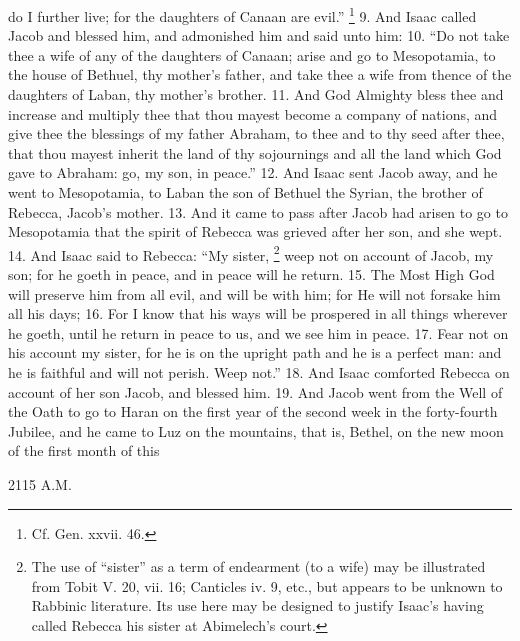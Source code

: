 do I further live; for the daughters of Canaan are evil.'' \footnote{Cf. Gen. xxvii. 46.} 9. And Isaac called Jacob and blessed him, and admonished him and said unto him: 10. ``Do not take thee a wife of any of the daughters of Canaan; arise and go to Mesopotamia, to the house of Bethuel, thy mother's father, and take thee a wife from thence of the daughters of Laban, thy mother's brother. 11. And God Almighty bless thee and increase and multiply thee that thou mayest become a company of nations, and give thee the blessings of my father Abraham, to thee and to thy seed after thee, that thou mayest inherit the land of thy sojournings and all the land which God gave to Abraham: go, my son, in peace.'' 12. And Isaac sent Jacob away, and he went to Mesopotamia, to Laban the son of Bethuel the Syrian, the brother of Rebecca, Jacob's mother. 13. And it came to pass after Jacob had arisen to go to Mesopotamia that the spirit of Rebecca was grieved after her son, and she wept. 14. And Isaac said to Rebecca: ``My sister, \footnote{The use of ``sister'' as a term of endearment (to a wife) may be illustrated from Tobit V. 20, vii. 16; Canticles iv. 9, etc., but appears to be unknown to Rabbinic literature. Its use here may be designed to justify Isaac's having called Rebecca his sister at Abimelech's court.} weep not on account of Jacob, my son; for he goeth in peace, and in peace will he return. 15. The Most High God will preserve him from all evil, and will be with him; for He will not forsake him all his days; 16. For I know that his ways will be prospered in all things wherever he goeth, until he return in peace to us, and we see him in peace. 17. Fear not on his account my sister, for he is on the upright path and he is a perfect man: and he is faithful and will not perish. Weep not.'' 18. And Isaac comforted Rebecca on account of her son Jacob, and blessed him. 19. And Jacob went from the Well of the Oath to go to Haran on the first year of the second week in the forty-fourth Jubilee, and he came to Luz on the mountains, that is, Bethel, on the new moon of the first month of this

2115 A.M.

